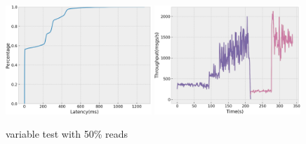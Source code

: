 \begin{figure}[!htb]
  \centering
  \includegraphics[width=0.49\textwidth,height=\textheight,keepaspectratio]{img/variable50_lat.png}
  \includegraphics[width=0.49\textwidth,height=\textheight,keepaspectratio]{img/variable50_tp.png}
  \caption{ variable test with 50\% reads }
  \label{fig:variable50-performance}
\end{figure}

